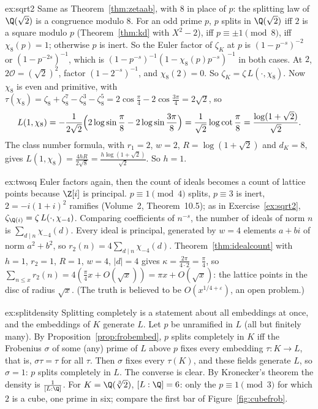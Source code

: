 \begin{solution}{ex:sqrt2}
\idea Same as Theorem~\ref{thm:zetaab}, with $8$ in place of $p$: the splitting law of $\Q(\sqrt2)$ is a congruence modulo $8$.
\writeup For an odd prime $p$, $p$ splits in $\Q(\sqrt2)$ iff $2$ is a square modulo $p$ (Theorem~\ref{thm:kd} with $X^2-2$), iff $p\equiv\pm1
\pmod8$, iff $\chi_8(p)=1$; otherwise $p$ is inert. So the Euler factor of $\zeta_K$ at $p$ is $(1-p^{-s})^{-2}$ or $(1-p^{-2s})^{-1}$, which is
$(1-p^{-s})^{-1}(1-\chi_8(p)p^{-s})^{-1}$ in both cases. At $2$, $2\mathcal O=(\sqrt2)^2$, factor $(1-2^{-s})^{-1}$, and $\chi_8(2)=0$. So
$\zeta_K=\zeta\,L(\cdot,\chi_8)$. Now $\chi_8$ is even and primitive, with $\tau(\chi_8)=\zeta_8+\zeta_8^7-\zeta_8^3-\zeta_8^5=2\cos\frac\pi4-2\cos
\frac{3\pi}4=2\sqrt2$, so
\[
L(1,\chi_8)=-\frac1{2\sqrt2}\Bigl(2\log\sin\frac\pi8-2\log\sin\frac{3\pi}8\Bigr)=\frac1{\sqrt2}\log\cot\frac\pi8=\frac{\log(1+\sqrt2)}{\sqrt2}.
\]
The class number formula, with $r_1=2$, $w=2$, $R=\log(1+\sqrt2)$ and $d_K=8$, gives $L(1,\chi_8)=\frac{4hR}{2\sqrt8}=\frac{h\log(1+\sqrt2)}{\sqrt2}$.
So $h=1$.
\end{solution}

\begin{solution}{ex:twosq}
\idea Euler factors again, then the count of ideals becomes a count of lattice points because $\Z[i]$ is principal.
\writeup $p\equiv1\pmod4$ splits, $p\equiv3$ is inert, $2=-i(1+i)^2$ ramifies (Volume~2, Theorem~10.5); as in Exercise~\ref{ex:sqrt2}, $\zeta_{\Q(i)}=\zeta\,L(\cdot,
\chi_{-4})$. Comparing coefficients of $n^{-s}$, the number of ideals of norm $n$ is $\sum_{d\mid n}\chi_{-4}(d)$. Every ideal is principal, generated
by $w=4$ elements $a+bi$ of norm $a^2+b^2$, so $r_2(n)=4\sum_{d\mid n}\chi_{-4}(d)$. Theorem~\ref{thm:idealcount} with $h=1$, $r_2=1$, $R=1$, $w=4$,
$|d|=4$ gives $\kappa=\frac{2\pi}{4\cdot2}=\frac\pi4$, so $\sum_{n\le x}r_2(n)=4(\frac\pi4x+O(\sqrt x))=\pi x+O(\sqrt x)$: the lattice points in the
disc of radius $\sqrt x$. (The truth is believed to be $O(x^{1/4+\varepsilon})$, an open problem.)
\end{solution}

\begin{solution}{ex:splitdensity}
\idea Splitting completely is a statement about all embeddings at once, and the embeddings of $K$ generate $L$.
\writeup Let $p$ be unramified in $L$ (all but finitely many). By Proposition~\ref{prop:frobembed}, $p$ splits completely in $K$ iff the Frobenius
$\sigma$ of some (any) prime of $L$ above $p$ fixes every embedding $\tau:K\to L$, that is, $\sigma\tau=\tau$ for all $\tau$. Then $\sigma$ fixes every
$\tau(K)$, and these fields generate $L$, so $\sigma=1$: $p$ splits completely in $L$. The converse is clear. By Kronecker's theorem the density is
$\frac1{[L:\Q]}$. For $K=\Q(\sqrt[3]2)$, $[L:\Q]=6$: only the $p\equiv1\pmod3$ for which $2$ is a cube, one prime in six; compare the first bar of
Figure~\ref{fig:cubefrob}.
\end{solution}

